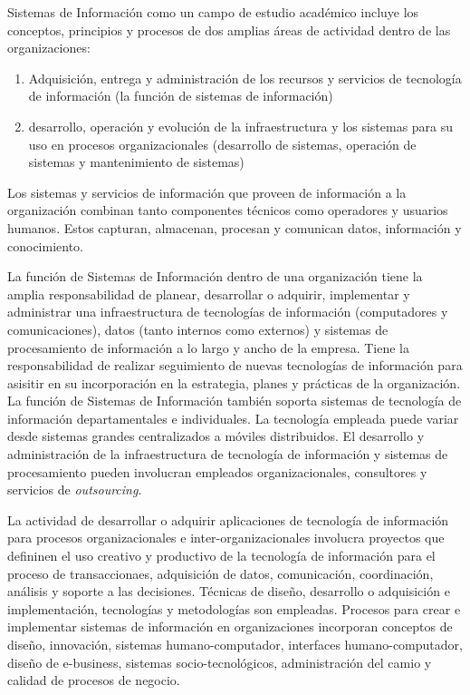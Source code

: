 Sistemas de Información como un campo de estudio académico incluye los conceptos, principios y procesos de dos amplias 
áreas  de actividad dentro de las organizaciones: 
\begin{enumerate}
\item Adquisición, entrega y administración de los recursos y servicios de tecnologí­a de información 
      (la función de sistemas de información)
\item desarrollo, operación y evolución de la infraestructura y los sistemas para su uso en procesos 
      organizacionales (desarrollo de sistemas, operación de sistemas y mantenimiento de sistemas)
\end{enumerate}

Los sistemas y servicios de información que proveen de información a la organización combinan tanto componentes 
técnicos como operadores y usuarios humanos. Estos capturan, almacenan, procesan y comunican datos, 
información y conocimiento.

La función de Sistemas de Información dentro de una organización tiene la amplia responsabilidad de planear, desarrollar
o adquirir, implementar y administrar una infraestructura de tecnologí­as de información (computadores y comunicaciones),
datos (tanto internos como externos) y sistemas de procesamiento de información a lo largo y ancho de la empresa. Tiene
la responsabilidad de realizar seguimiento de nuevas tecnologí­as de información para asisitir en su incorporación en la
estrategia, planes y prácticas de la organización. La función de Sistemas de Información también soporta sistemas de
tecnologí­a de información departamentales e individuales. La tecnologí­a empleada puede variar desde sistemas grandes
centralizados a móviles distribuidos. El desarrollo y administración de la infraestructura de tecnologí­a de información 
y sistemas de procesamiento pueden involucran empleados organizacionales, consultores y servicios de \emph{outsourcing}.

La actividad de desarrollar o adquirir aplicaciones de tecnologí­a de información para procesos organizacionales e
inter-organizacionales involucra proyectos que defininen el uso creativo y productivo de la tecnologí­a de información
para el proceso de transaccionaes, adquisición de datos, comunicación, coordinación, análisis y soporte a las
decisiones. Técnicas de diseño, desarrollo o adquisición e implementación, tecnologí­as y metodologí­as son empleadas.
Procesos para crear e implementar sistemas de información en organizaciones incorporan conceptos de diseño,
innovación, sistemas humano-computador, interfaces humano-computador, diseño de e-business, sistemas socio-tecnológicos,
administración del camio y calidad de procesos de negocio.







